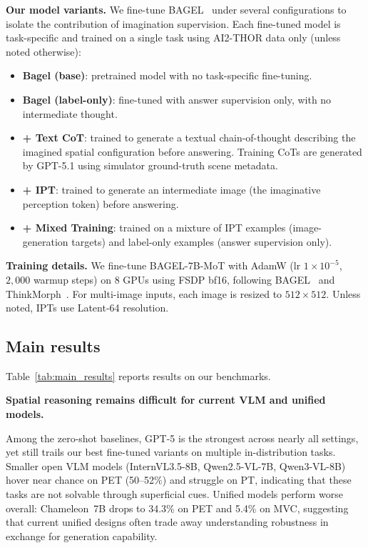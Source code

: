 \documentclass{llmxive}
\begin{document}
\noindent\textbf{Our model variants.}
We fine-tune BAGEL~\cite{deng2025bagel} under several configurations to isolate the contribution of imagination supervision. Each fine-tuned model is task-specific and trained on a single task using AI2-THOR data only (unless noted otherwise):
\begin{itemize}
    \item \textbf{Bagel (base)}: pretrained model with no task-specific fine-tuning.
    \item \textbf{Bagel (label-only)}: fine-tuned with answer supervision only, with no intermediate thought.
    \item \textbf{+ Text CoT}: trained to generate a textual chain-of-thought describing the imagined spatial configuration before answering. Training CoTs are generated by GPT-5.1 using simulator ground-truth scene metadata.
    \item \textbf{+ IPT}: trained to generate an intermediate image (the imaginative perception token) before answering.
    \item \textbf{+ Mixed Training}: trained on a mixture of IPT examples (image-generation targets) and label-only examples (answer supervision only).
\end{itemize}

\noindent\textbf{Training details.}
We fine-tune BAGEL-7B-MoT with AdamW (lr $1{\times}10^{-5}$, $2{,}000$ warmup steps) on $8$ GPUs using FSDP bf16, following BAGEL~\cite{deng2025bagel} and ThinkMorph~\cite{gu2025thinkmorph}.
For multi-image inputs, each image is resized to $512{\times}512$.
Unless noted, IPTs use Latent-64 resolution.
\vspace{-0.5em}
\subsection{Main results}

Table~\ref{tab:main_results} reports results on our benchmarks.

\begin{takeawayblock}
    \textbf{Spatial reasoning remains difficult for current VLM and unified models.}
\end{takeawayblock}
Among the zero-shot baselines, GPT-5 is the strongest across nearly all settings, yet still trails our best fine-tuned variants on multiple in-distribution tasks.
Smaller open VLM models (InternVL3.5-8B, Qwen2.5-VL-7B, Qwen3-VL-8B) hover near chance on PET (50--52\%) and struggle on PT, indicating that these tasks are not solvable through superficial cues.
Unified models perform worse overall: Chameleon~7B drops to 34.3\% on PET and 5.4\% on MVC, suggesting that current unified designs often trade away understanding robustness in exchange for generation capability.
\end{document}
